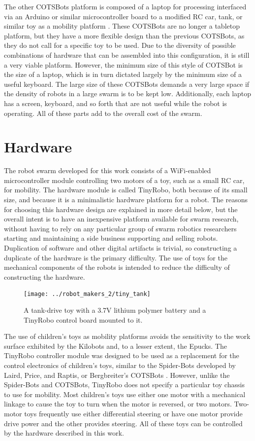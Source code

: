 \documentclass[]{article}
\begin{document}
The other COTSBots platform is composed of a laptop for processing interfaced via an Arduino or similar microcontroller board to a modified RC car, tank, or similar toy as a mobility platform \cite{soule2011cotsbots}.
These COTSBots are no longer a tabletop platform, but they have a more flexible design than the previous COTSBots, as they do not call for a specific toy to be used.
Due to the diversity of possible combinations of hardware that can be assembled into this configuration, it is still a very viable platform. 
However, the minimum size of this style of COTSBot is the size of a laptop, which is in turn dictated largely by the minimum size of a useful keyboard. 
The large size of these COTSBots demands a very large space if the density of robots in a large swarm is to be kept low. 
Additionally, each laptop has a screen, keyboard, and so forth that are not useful while the robot is operating. 
All of these parts add to the overall cost of the swarm. 

\section{Hardware}

The robot swarm developed for this work consists of a WiFi-enabled microcontroller module controlling two motors of a toy, such as a small RC car, for mobility. 
The hardware module is called TinyRobo, both because of its small size, and because it is a minimalistic hardware platform for a robot. 
The reasons for choosing this hardware design are explained in more detail below, but the overall intent is to have an inexpensive platform available for swarm research, without having to rely on any particular group of swarm robotics researchers starting and maintaining a side business supporting and selling robots.
Duplication of software and other digital artifacts is trivial, so constructing a duplicate of the hardware is the primary difficulty. 
The use of toys for the mechanical components of the robots is intended to reduce the difficulty of constructing the hardware. 

\begin{figure}
\centering
\texttt{[image: ../robot\_makers\_2/tiny\_tank]}
\caption{A tank-drive toy with a 3.7V lithium polymer battery and a TinyRobo control board mounted to it.}
\end{figure}

The use of children's toys as mobility platforms avoids the sensitivity to the work surface exhibited by the Kilobots and, to a lesser extent, the Epucks.
The TinyRobo controller module was designed to be used as a replacement for the control electronics of children's toys, similar to the Spider-Bots developed by Laird, Price, and Raptis, or Bergbreiter's COTSBots \cite{lairdspider, bergbreiter2003cotsbots}.
However, unlike the Spider-Bots and COTSBots, TinyRobo does not specify a particular toy chassis to use for mobility. 
Most children's toys use either one motor with a mechanical linkage to cause the toy to turn when the motor is reversed, or two motors.
Two-motor toys frequently use either differential steering or have one motor provide drive power and the other provides steering. 
All of these toys can be controlled by the hardware described in this work. 
\end{document}
